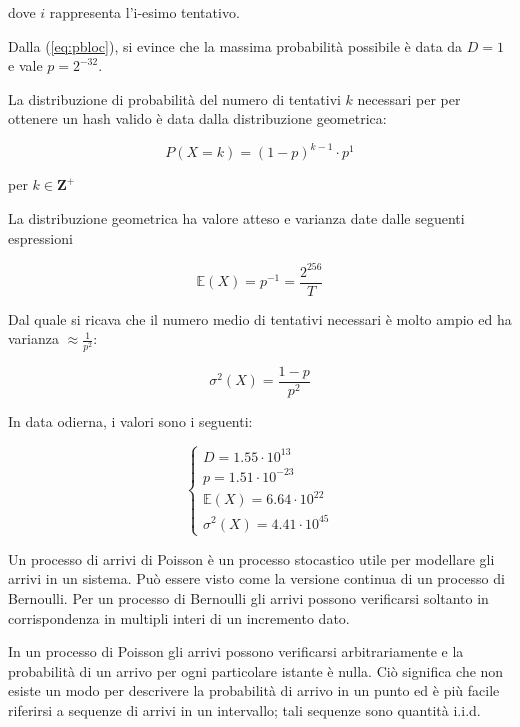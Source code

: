 \documentclass{book}
\theoremstyle{definition}
\begin{document}
dove $i$ rappresenta l'i-esimo tentativo.

Dalla (\ref{eq:pbloc}), si evince che la massima probabilità possibile è data da $D = 1$ e vale $p = 2^{-32}$.

La distribuzione di probabilità del numero di tentativi $k$ necessari per per ottenere un hash valido è data dalla distribuzione geometrica:

\begin{equation}
    P(X = k) = (1 - p)^{k-1} \cdot p^{1} \label{distribuzione_geometrica}
\end{equation}

per $k \in \mathbf{Z}^{+}$

La distribuzione geometrica ha valore atteso e varianza date dalle seguenti espressioni

\begin{equation}
    \mathbb{E}(X) = p^{-1} = \frac{2^{256}}{T} \label{valore atteso}
\end{equation}

Dal quale si ricava che il numero medio di tentativi necessari è molto ampio ed ha varianza $\approx \frac{1}{p^{2}}$:

\begin{equation}
    \sigma^{2}(X) = \frac{1 - p}{p^2} \label{varianza}
\end{equation}

In data odierna, i valori sono i seguenti:

\begin{equation}
    \left \{
        \begin{array}{ll}
            D = 1.55 \cdot 10^{13} \\
            p = 1.51 \cdot 10^{-23} \\
            \mathbb{E}(X) = 6.64 \cdot 10^{22}\\
            \sigma^{2}(X) = 4.41 \cdot 10^{45}
        \end{array}
    \right .
\end{equation}

Un processo di arrivi di Poisson è un processo stocastico utile per modellare gli arrivi in un sistema. Può essere visto come la versione continua di un processo di Bernoulli. Per un processo di Bernoulli gli arrivi possono verificarsi soltanto in corrispondenza in multipli interi di un incremento dato.

In un processo di Poisson gli arrivi possono verificarsi arbitrariamente e la probabilità di un arrivo per ogni particolare istante è nulla. 
Ciò significa che non esiste un modo per descrivere la probabilità di arrivo in un punto ed è più facile riferirsi a sequenze di arrivi in un intervallo; tali sequenze sono quantità i.i.d.
\end{document}
